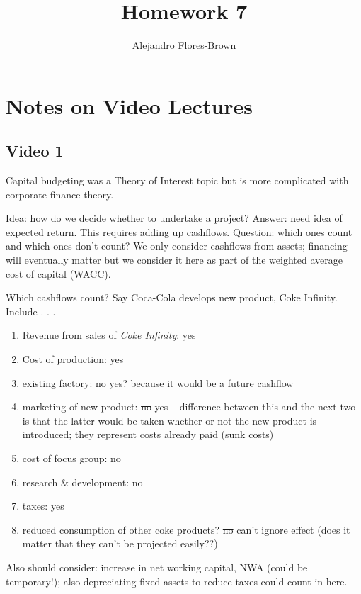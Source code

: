 \documentclass[12pt, letterpaper, parskip = full]{article}
\title{Homework 7}
\author{Alejandro Flores-Brown}
\begin{document}
	\maketitle

    \section{Notes on Video Lectures}

    \subsection{Video 1}

    Capital budgeting was a Theory of Interest topic but is more complicated with corporate finance theory.

    Idea: how do we decide whether to undertake a project? Answer: need idea of expected return. This requires adding up cashflows. Question: which ones count and which ones don't count? We only consider cashflows from assets; financing will eventually matter but we consider it here as part of the weighted average cost of capital (WACC). 

    Which cashflows count? Say Coca-Cola develops new product, Coke Infinity. Include . . . 

    \begin{enumerate}
    \item Revenue from sales of \emph{Coke Infinity}: yes
    \item Cost of production: yes
    \item existing factory: \sout{no} yes? because it would be a future cashflow
    \item marketing of new product: \sout{no} yes -- difference between this and the next two is that the latter would be taken whether or not the new product is introduced; they represent costs already paid (sunk costs)
    \item cost of focus group: no
    \item research \& development: no
    \item taxes: yes
    \item reduced consumption of other coke products? \sout{no} can't ignore effect (does it matter that they can't be projected easily??)
    \end{enumerate}

    Also should consider: increase in net working capital, NWA (could be temporary!); also depreciating fixed assets to reduce taxes could count in here.
\end{document}
